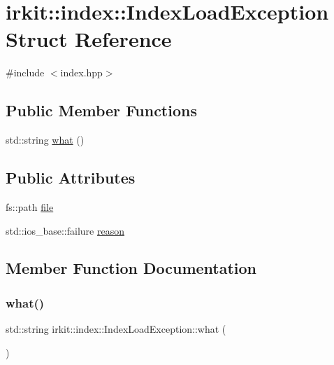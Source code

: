 \hypertarget{structirkit_1_1index_1_1IndexLoadException}{}\section{irkit\+:\+:index\+:\+:Index\+Load\+Exception Struct Reference}
\label{structirkit_1_1index_1_1IndexLoadException}


{\ttfamily \#include $<$index.\+hpp$>$}

\subsection*{Public Member Functions}
\begin{DoxyCompactItemize}
\item 
std\+::string \mbox{\hyperlink{structirkit_1_1index_1_1IndexLoadException_a4fd8f3ce857b2e5040011564e34805f9}{what}} ()
\end{DoxyCompactItemize}
\subsection*{Public Attributes}
\begin{DoxyCompactItemize}
\item 
fs\+::path \mbox{\hyperlink{structirkit_1_1index_1_1IndexLoadException_a4df8f9192b0da363fac13aaebb0b4a3a}{file}}
\item 
std\+::ios\+\_\+base\+::failure \mbox{\hyperlink{structirkit_1_1index_1_1IndexLoadException_a843f66fcd135c9a396d41324c2817ab3}{reason}}
\end{DoxyCompactItemize}


\subsection{Member Function Documentation}
\mbox{\label{structirkit_1_1index_1_1IndexLoadException_a4fd8f3ce857b2e5040011564e34805f9}} 
\subsubsection{\texorpdfstring{what()}{what()}}
{\footnotesize\ttfamily std\+::string irkit\+::index\+::\+Index\+Load\+Exception\+::what (\begin{DoxyParamCaption}{ }\end{DoxyParamCaption})\hspace{0.3cm}{\ttfamily [inline]}}




